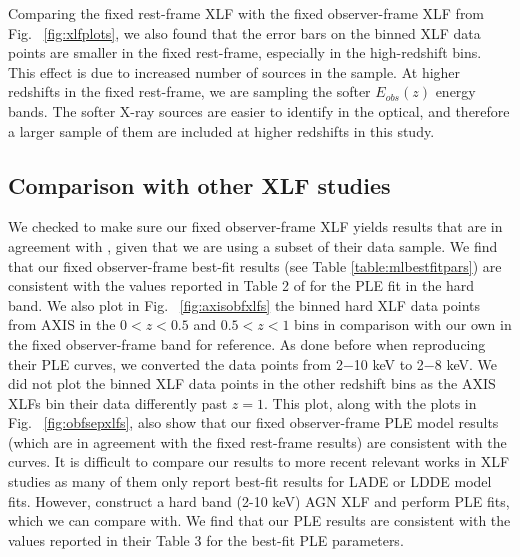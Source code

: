 \documentclass[fleqn,usenatbib]{mnras}
\begin{document}
    Comparing the fixed rest-frame XLF with the fixed observer-frame XLF from Fig.~ \ref{fig:xlfplots}, we also found that the error bars on the binned XLF data points are smaller in the fixed rest-frame, especially in the high-redshift bins.
    This effect is due to increased number of sources in the sample.
    At higher redshifts in the fixed rest-frame, we are sampling the softer $E_{obs}(z)$ energy bands. 
    The softer X-ray sources are easier to identify in the optical, and therefore a larger sample of them are included at higher redshifts in this study.

    
	\subsection{Comparison with other XLF studies}\label{subsec:otherXLFscomparison}  
    
    We checked to make sure our fixed observer-frame XLF yields results that are in agreement with \cite{ebrero2009xmm}, given that we are using a subset of their data sample. 
    We find that our fixed observer-frame best-fit results (see Table \ref{table:mlbestfitpars}) are consistent with the values reported in Table 2 of \cite{ebrero2009xmm} for the PLE fit in the hard band.
    We also plot in Fig.~ \ref{fig:axisobfxlfs} the binned hard XLF data points from AXIS in the $0 < z < 0.5$ and $0.5 < z < 1$ bins in comparison with our own in the fixed observer-frame band for reference.
    As done before when reproducing their PLE curves, we converted the data points from 2$-$10 keV to 2$-$8 keV.
    We did not plot the binned XLF data points in the other redshift bins as the AXIS XLFs bin their data differently past $z = 1$.
    This plot, along with the plots in Fig.~ \ref{fig:obfsepxlfs}, also show that our fixed observer-frame PLE model results (which are in agreement with the fixed rest-frame results) are consistent with the \cite{ebrero2009xmm} curves.
    It is difficult to compare our results to more recent relevant works in XLF studies as many of them only report best-fit results for LADE or LDDE model fits.
    However, \cite{ueda2003hardxlf} construct a hard band (2-10 keV) AGN XLF and perform PLE fits, which we can compare with. 
    We find that our PLE results are consistent with the values reported in their Table 3 for the best-fit PLE parameters.
    
\end{document}
